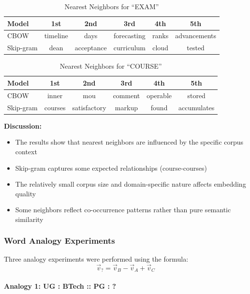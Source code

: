\documentclass[12pt,a4paper]{article}
\begin{document}
\begin{table}[H]
\centering
\caption{Nearest Neighbors for ``EXAM''}
\begin{tabular}{@{}lccccc@{}}
\toprule
\textbf{Model} & \textbf{1st} & \textbf{2nd} & \textbf{3rd} & \textbf{4th} & \textbf{5th} \\
\midrule
CBOW & timeline & days & forecasting & ranks & advancements \\
Skip-gram & dean & acceptance & curriculum & cloud & tested \\
\bottomrule
\end{tabular}
\end{table}

\begin{table}[H]
\centering
\caption{Nearest Neighbors for ``COURSE''}
\begin{tabular}{@{}lccccc@{}}
\toprule
\textbf{Model} & \textbf{1st} & \textbf{2nd} & \textbf{3rd} & \textbf{4th} & \textbf{5th} \\
\midrule
CBOW & inner & mou & comment & operable & stored \\
Skip-gram & courses & satisfactory & markup & found & accumulates \\
\bottomrule
\end{tabular}
\end{table}

\textbf{Discussion:}
\begin{itemize}
    \item The results show that nearest neighbors are influenced by the specific corpus context
    \item Skip-gram captures some expected relationships (course-courses)
    \item The relatively small corpus size and domain-specific nature affects embedding quality
    \item Some neighbors reflect co-occurrence patterns rather than pure semantic similarity
\end{itemize}

\subsubsection{Word Analogy Experiments}

Three analogy experiments were performed using the formula:
\begin{equation}
    \vec{v}_{?} = \vec{v}_B - \vec{v}_A + \vec{v}_C
\end{equation}

\paragraph{Analogy 1: UG : BTech :: PG : ?}
\end{document}
